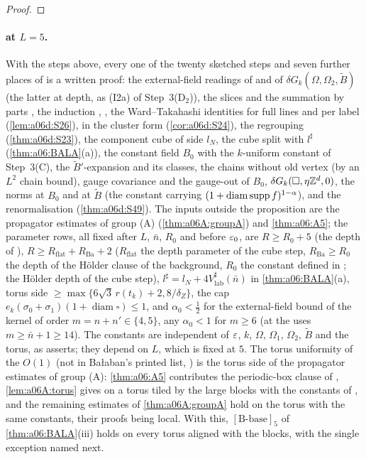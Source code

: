 \begin{proof}
\end{proof}

\paragraph{\cite[Prop.~1, (1.33)]{Ba3} at $L=5$.} With the steps above, every one of the twenty sketched steps and seven further places of \cite[pp.~420--445]{Ba3} is a written proof: the external-field readings of \cite[(1.16)]{Ba3} and of $\delta G_k(\Omega,\Omega_2,\tilde B)$ \cite[pp.~414, 424]{Ba3} (the latter at depth, as (I2a) of Step~3(D$_2$)), the slices and the summation by parts \cite[(2.6)--(2.12)]{Ba3}, the induction \cite[(2.16)]{Ba3}, \cite[Prop.~2.2, (2.17), Cor.~2.3]{Ba3}, the Ward--Takahashi identities for full lines and per label (\cref{lem:a06d:S26}), \cite[(3.1)]{Ba3} in the cluster form (\cref{cor:a06d:S24}), the regrouping (\cref{thm:a06d:S23}), the component cube of side $l_N$, the cube split with $l^\sharp$ (\cref{thm:a06:BALA}(a)), the constant field $B_0$ with the $k$-uniform constant of Step~3(C), the $\tilde B'$-expansion and its classes, the chains without old vertex (by an $L^2$ chain bound), gauge covariance and the gauge-out of $B_0$, $\delta G_k(\square,\eta\mathbb Z^d,0)$, the norms \cite[(1.32)]{Ba3} at $B_0$ and at $\tilde B$ (the constant carrying $(1+\operatorname{diam}\operatorname{supp} f)^{1-\alpha}$), and the renormalisation (\cref{thm:a06d:S49}). The inputs outside the proposition are the propagator estimates of group (A) (\cref{thm:a06A:groupA}) and \cref{thm:a06:A5}; the parameter rows, all fixed after $L$, $\bar n$, $R_0$ and before $\varepsilon_0$, are $R\ge R_0+5$ (the depth of \cite[(3.1)]{Ba3}), $R\ge R_{\mathrm{flat}}+R_{\mathrm{Ba}}+2$ ($R_{\mathrm{flat}}$ the depth parameter of the cube step, $R_{\mathrm{Ba}}\ge R_0$ the depth of the H\"older clause of the background, $R_0$ the constant defined in \cite[(2.19)]{Ba4}; the H\"older depth of the cube step), $l^\sharp=l_N+4V^\sharp_{\mathrm{lab}}(\bar n)$ in \cref{thm:a06:BALA}(a), torus side $\ge\max\{6\sqrt3\,r(t_k)+2,8/\delta_Z\}$, the cap $e_k(\sigma_0+\sigma_1)(1+\operatorname{diam}\square)\le1$, and $\alpha_0<\frac12$ for the external-field bound of the kernel \cite[(1.16)]{Ba3} of order $m=n+n'\in\{4,5\}$, any $\alpha_0<1$ for $m\ge6$ (at the uses $m\ge\bar n+1\ge14$). The constants are independent of $\varepsilon$, $k$, $\Omega$, $\Omega_1$, $\Omega_2$, $\tilde B$ and the torus, as \cite[(1.33)]{Ba3} asserts; they depend on $L$, which is fixed at $5$. The torus uniformity of the $O(1)$ (not in Ba{\l}aban's printed list, \cite[p.~421]{Ba3}) is the torus side of the propagator estimates of group (A): \cref{thm:a06:A5} contributes the periodic-box clause of \cite[Lemma~2.4]{Ba4}, \cref{lem:a06A:torus} gives \cite[Prop.~2.1]{Ba1} on a torus tiled by the large blocks with the constants of \cite{Ba4}, and the remaining estimates of \cref{thm:a06A:groupA} hold on the torus with the same constants, their proofs being local. With this, $[\mathrm B\text{-base}]_5$ of \cref{thm:a06:BALA}(iii) holds on every torus aligned with the blocks, with the single exception named next.

